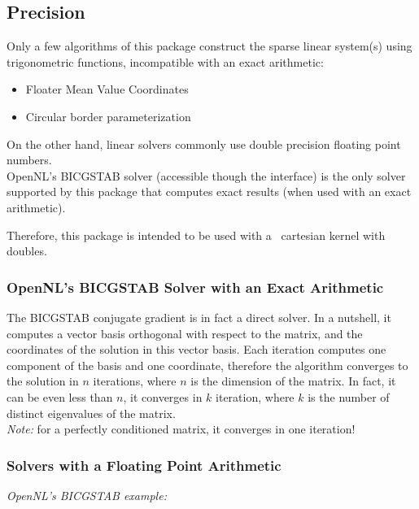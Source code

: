 \subsection{Precision}

Only a few algorithms of this package construct the sparse linear system(s)
using trigonometric functions, incompatible with an exact arithmetic:

\begin{itemize}

\item Floater Mean Value Coordinates

\item Circular border parameterization

\end{itemize}

On the other hand, linear solvers commonly use double precision floating point
numbers. \\
OpenNL's BICGSTAB solver (accessible though the
 interface)
is the only solver supported by this package that
computes exact results (when used with an exact arithmetic).

Therefore, this package is intended to be used with a \cgal\
cartesian kernel with doubles.


\subsubsection{OpenNL's BICGSTAB Solver with an Exact Arithmetic}

The BICGSTAB conjugate gradient is in fact a direct solver.
In a nutshell, it computes a vector basis
orthogonal with respect to the matrix, and the coordinates of the solution in this vector basis.
Each iteration computes one component of the basis and one coordinate, therefore the algorithm
converges to the solution in $n$ iterations, where $n$ is the dimension of the matrix.
In fact, it can be even less than $n$, it converges in $k$ iteration, where $k$ is the number
of distinct eigenvalues of the matrix. \\
\emph{Note:} for a perfectly conditioned matrix, it converges in one iteration!


\subsubsection{Solvers with a Floating Point Arithmetic}

\emph{OpenNL's BICGSTAB example:}


